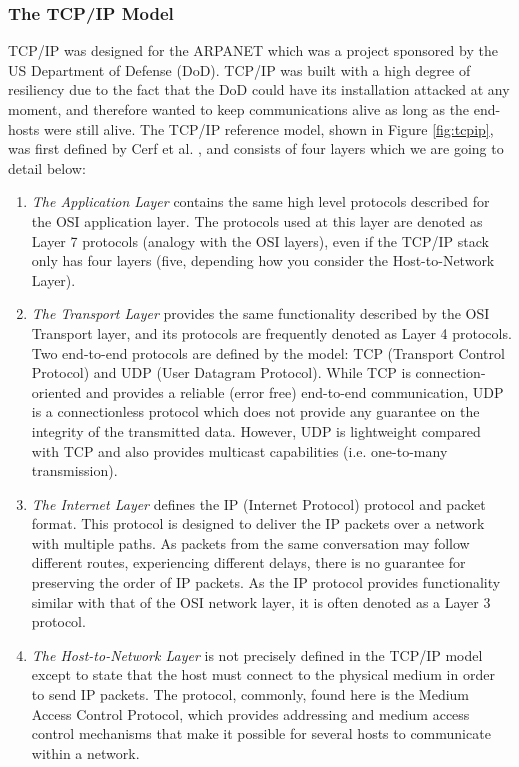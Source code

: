 \subsubsection{The TCP/IP Model}

TCP/IP was designed for the ARPANET which was a project sponsored by the US Department of Defense (DoD). TCP/IP was built with a high degree of resiliency due to the fact that the DoD could have its installation attacked at any moment, and therefore wanted to keep communications alive as long as the end-hosts were still alive. The TCP/IP reference model, shown in Figure \ref{fig:tcpip}, was first defined by Cerf et al. \cite{CerfKahn}, and consists of four layers which we are going to detail below:


\begin{enumerate}

 \item \textit{The Application Layer} contains the same high level protocols described for the OSI application layer. The protocols used at this layer are denoted as Layer 7 protocols (analogy with the OSI layers), even if the TCP/IP stack only has four layers (five, depending how you consider the Host-to-Network 
Layer).

 \item \textit{The Transport Layer} provides the same functionality described by the OSI Transport layer, and its protocols are frequently denoted as Layer 4 protocols. Two end-to-end protocols are defined by the model: TCP (Transport Control Protocol) and UDP (User Datagram Protocol). While TCP is connection-oriented and provides a reliable (error free) end-to-end communication, UDP is a connectionless protocol which does not provide any guarantee on the integrity of the transmitted data. However, UDP is lightweight compared with TCP and also provides multicast capabilities (i.e. one-to-many transmission).


 \item \textit{The Internet Layer} defines the IP (Internet Protocol) protocol and packet format. This protocol is designed to deliver the IP packets over a network with multiple paths. As packets from the same conversation may follow different routes, experiencing different delays, there is no guarantee for preserving the order of IP packets. As the IP protocol provides functionality similar with that of the OSI network layer, it is often denoted as a Layer 3 protocol.


 \item \textit{The Host-to-Network Layer} is not precisely defined in the TCP/IP model except to state that the host must connect to the physical medium in order to send IP packets. The protocol, commonly, found here is the Medium Access Control Protocol, which provides addressing and medium access control mechanisms that make it possible for several hosts to communicate within a network.

\end{enumerate}


